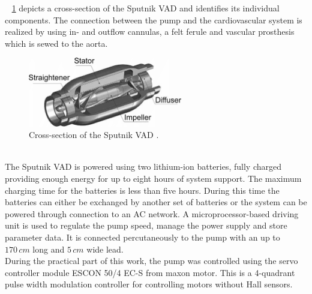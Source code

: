 \figurename~ \ref{fig:sput_cross} depicts a cross-section of the Sputnik VAD and identifies its individual components.
The connection between the pump and the cardiovascular system is realized by using in- and outflow cannulas, a felt ferule and vascular prosthesis which is sewed to the aorta. \cite{Sputnik1}
\begin{figure}[ht]
  \centering
  \includegraphics[width=0.6\textwidth]{images/chapt_4/sputnik_cross.png}
  \caption[Cross-section of Sputnik VAD \cite{Sputnik6}]{Cross-section of the Sputnik VAD \cite{Sputnik6}.}
  \label{fig:sput_cross}
\end{figure}
\\The Sputnik VAD is powered using two lithium-ion batteries, fully charged providing enough energy for up to eight hours of system support. The maximum charging time for the batteries is less than five hours. During this time the batteries can either be exchanged by another set of batteries or the system can be powered through connection to an AC network. A microprocessor-based driving unit is used to regulate the pump speed, manage the power supply and store parameter data. It is connected percutaneously to the pump with an up to $170\, cm$ long and $5\, cm$ wide lead. \cite{Sputnik1}
\\During the practical part of this work, the pump was controlled using the servo controller module ESCON 50/4 EC-S from maxon motor. This is a 4-quadrant pulse width modulation controller for controlling motors without Hall sensors.

